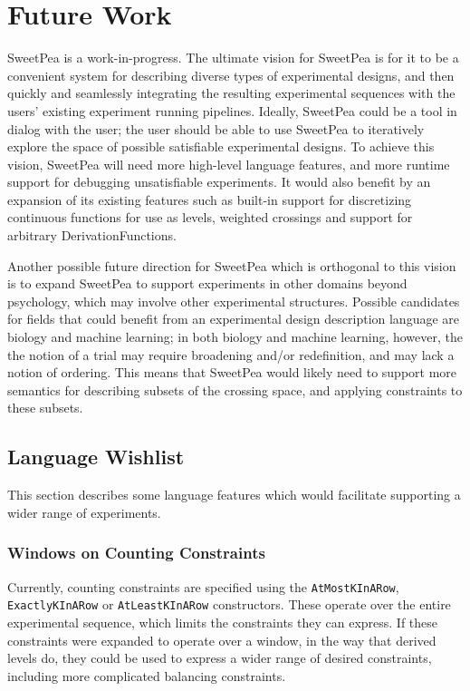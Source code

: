 \chapter{Future Work}

SweetPea is a work-in-progress. The ultimate vision for SweetPea is for it to be a convenient system for describing diverse types of experimental designs, and then quickly and seamlessly integrating the resulting experimental sequences with the users' existing experiment running pipelines. Ideally, SweetPea could be a tool in dialog with the user; the user should be able to use SweetPea to iteratively explore the space of possible satisfiable experimental designs. To achieve this vision, SweetPea will need more high-level language features, and more runtime support for debugging unsatisfiable experiments. It would also benefit by an expansion of its existing features such as built-in support for discretizing continuous functions for use as levels, weighted crossings and support for arbitrary DerivationFunctions.

Another possible future direction for SweetPea which is orthogonal to this vision is to expand SweetPea to support experiments in other domains beyond psychology, which may involve other experimental structures. Possible candidates for fields that could benefit from an experimental design description language are biology and machine learning; in both biology and machine learning, however, the the notion of a trial may require broadening and/or redefinition, and may lack a notion of ordering. This means that SweetPea would likely need to support more semantics for describing subsets of the crossing space, and applying constraints to these subsets.

\section{Language Wishlist}

This section describes some language features which would facilitate supporting a wider range of experiments.

\subsection{Windows on Counting Constraints}
Currently, counting constraints are specified using the \texttt{AtMostKInARow}, \texttt{ExactlyKInARow} or \texttt{AtLeastKInARow} constructors. These operate over the entire experimental sequence, which limits the constraints they can express. If these constraints were expanded to operate over a window, in the way that derived levels do, they could be used to express a wider range of desired constraints, including more complicated balancing constraints.

